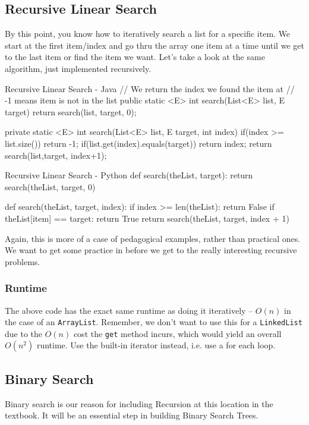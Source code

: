 \subsection{Recursive Linear Search}

By this point, you know how to iteratively search a list for a specific item.  We start at the first item/index and go thru the array one item at a time until we get to the last item or find the item we want.   Let's take a look at the same algorithm, just implemented recursively.


\begin{javacode}{Recursive Linear Search - Java}
// We return the index we found the item at
// -1 means item is not in the list
public static <E> int search(List<E> list, E target){
	return search(list, target, 0);
}

private static <E> int search(List<E> list, E target, int index) {
	if(index >= list.size()){
		return -1;
	}
	if(list.get(index).equals(target)){
		return index;
	}
	return search(list,target, index+1);
}
\end{javacode}

\begin{pycode}{Recursive Linear Search - Python}
def search(theList, target):
	return search(theList, target, 0)

def search(theList, target, index):
	if index >= len(theList):
		return False 
	if theList[item] == target:
		return True
	return search(theList, target, index + 1)
\end{pycode}



Again, this is more of a case of pedagogical examples, rather than practical ones.  We want to get some practice in before we get to the really interesting recursive problems.  

\subsubsection{Runtime}  
The above code has the exact same runtime as doing it iteratively -- $O(n)$ in the case of an \texttt{ArrayList}. Remember, we don't want to use this for a \texttt{LinkedList} due to the $O(n)$ cost the \texttt{get} method incurs, which would yield an overall $O(n^2)$ runtime. Use the built-in iterator instead, i.e. use a for each loop.
\subsection{Binary Search}
Binary search is our reason for including Recursion at this location in the textbook.   It will be an essential step in building Binary Search Trees.



